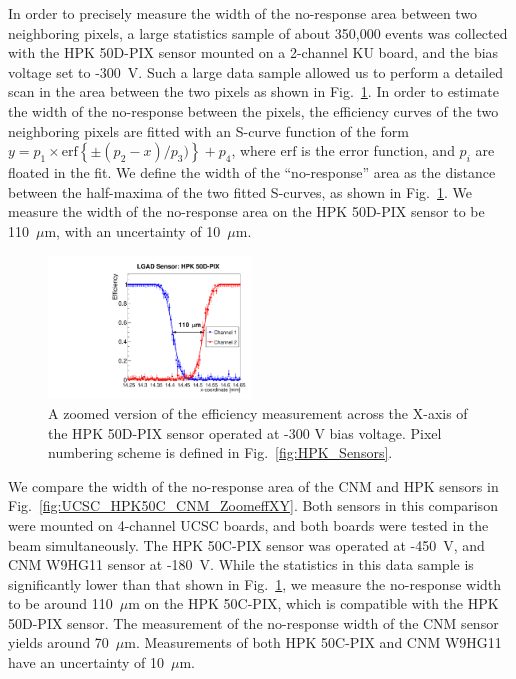\documentclass[preprint,1p]{elsarticle}
\begin{document}
In order to precisely measure the width of the no-response area between two
neighboring pixels, a large statistics sample of about 350,000 events was
collected with the HPK 50D-PIX sensor mounted on a 2-channel KU board, and the
bias voltage set to -300~V. Such a large data sample allowed us to perform a
detailed scan in the area between the two pixels as shown in
Fig.~\ref{fig:FNAL_HPK50_ZoomeffXY}. In order to estimate the width of the
no-response between the pixels, the efficiency curves of the two neighboring
pixels are fitted with an S-curve function of the form $y=p_1\times
\mathrm{erf}\left\{\pm(p_2-x)/p_3)\right\}+p_4$, where $\mathrm{erf}$ is the error
function, and $p_i$ are floated in the fit. We define the width of the
``no-response'' area as the distance between the half-maxima of the two fitted
S-curves, as shown in Fig.~\ref{fig:FNAL_HPK50_ZoomeffXY}. We measure the width
of the no-response area on the HPK 50D-PIX sensor to be 110~$\mu$m, with an
uncertainty of 10~$\mu$m.

\begin{figure}[!htbp] 
\centering
\includegraphics[width=0.48\textwidth]{figs/KUBoard_HPK50DPix_Run638-781/Eff_vs_X_HPK50DPIX_Ch1_2_fit.pdf} 
\caption{A zoomed version of the efficiency measurement across the X-axis of the HPK 50D-PIX sensor operated at -300 V bias voltage. Pixel numbering scheme is defined in Fig.~\ref{fig:HPK_Sensors}.} 
\label{fig:FNAL_HPK50_ZoomeffXY} 
\end{figure} 

We compare the width of the no-response area of the CNM and HPK sensors in
Fig.~\ref{fig:UCSC_HPK50C_CNM_ZoomeffXY}. Both sensors in this comparison were
mounted on 4-channel UCSC boards, and both boards were tested in the beam
simultaneously. The HPK 50C-PIX sensor was operated at -450~V, and CNM W9HG11
sensor at -180~V. While the statistics in this data sample is significantly
lower than that shown in Fig.~\ref{fig:FNAL_HPK50_ZoomeffXY}, we measure the
no-response width to be around 110~$\mu$m on the HPK 50C-PIX, which is
compatible with the HPK 50D-PIX sensor. The measurement of the no-response width
of the CNM sensor yields around 70~$\mu$m. Measurements of both HPK 50C-PIX and
CNM W9HG11 have an uncertainty of 10~$\mu$m.
\end{document}
